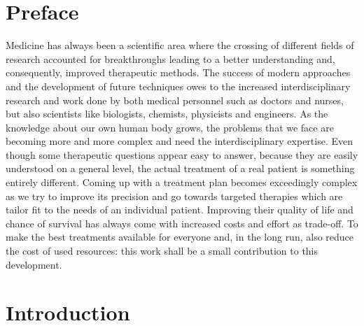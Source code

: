 \chapter*{Preface}

Medicine has always been a scientific area where the crossing of different fields of research accounted for breakthroughs leading to a better understanding and, consequently, improved therapeutic methods.
The success of modern approaches and the development of future techniques owes to the increased interdisciplinary research and work done by both medical personnel such as doctors and nurses, but also scientists like biologists, chemists, physicists and engineers.
As the knowledge about our own human body grows, the problems that we face are becoming more and more complex and need the interdisciplinary expertise.
Even though some therapeutic questions appear easy to answer, because they are easily understood on a general level, the actual treatment of a real patient is something entirely different.
Coming up with a treatment plan becomes exceedingly complex as we try to improve its precision and go towards targeted therapies which are tailor fit to the needs of an individual patient.
Improving their quality of life and chance of survival has always come with increased costs and effort as trade-off.
To make the best treatments available for everyone and, in the long run, also reduce the cost of used resources:
this work shall be a small contribution to this development.

\chapter{Introduction}
\label{chap:intro}




